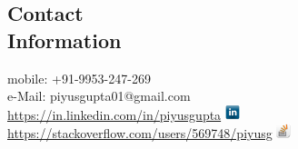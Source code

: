 \documentclass[margin,line]{resume}
\begin{document}
\begin{resume}

    \section{\mysidestyle Contact\\Information}

       				                      \hfill mobile: +91-9953-247-269 \vspace{1mm}\\\vspace{1mm}
        					      \hfill e-Mail: piyusgupta01@gmail.com   \vspace{1mm}\\\vspace{1mm}
   \hfill \url{https://in.linkedin.com/in/piyusgupta} \href{http://in.linkedin.com/in/piyusgupta}{\includegraphics[width=16px]{linkedin-logo.png}}\\\vspace{1mm}
   \hfill \url{https://stackoverflow.com/users/569748/piyusg} \href{https://stackoverflow.com/users/569748/piyusg}{\includegraphics[width=16px]{stackoverflow-logo1.png}}

\end{resume}
\end{document}
